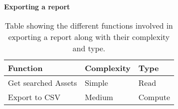 \begin{center}
    \textbf{Exporting a report}
\end{center}

\begin{table}[H]
\centering
    \begin{tabular}{|l|l|l|}
        \hline
        \textbf{Function} & \textbf{Complexity} & \textbf{Type} \\
        \hline
        \hline
        Get searched Assets & Simple & Read\\
        \hline
        Export to CSV & Medium & Compute\\
        \hline
        
    \end{tabular}
\caption{Table showing the different functions involved in exporting a report along with their complexity and type.}\label{tab:ExportReportFunctions}
\end{table}